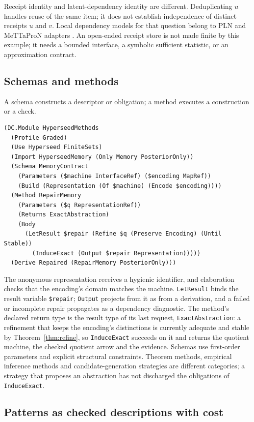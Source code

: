\documentclass[11pt]{article}
\newcommand{\code}[1]{\texttt{#1}}
\theoremstyle{definition}
\theoremstyle{plain}
\begin{document}
Receipt identity and latent-dependency identity are different. Deduplicating $u$ handles reuse of
the same item; it does not establish independence of distinct receipts $u$ and $v$. Local dependency
models for that question belong to PLN and MeTTaProN adapters \cite{plnoverlap,omegapln}. An
open-ended receipt store is not made finite by this example; it needs a bounded interface, a
symbolic sufficient statistic, or an approximation contract.

\subsection{Schemas and methods}

A schema constructs a descriptor or obligation; a method executes a construction or a check.
\begin{lstlisting}[basicstyle=\ttfamily\footnotesize,title={\scriptsize\ttfamily fixtures/hyperseed\_methods.metta}]
(DC.Module HyperseedMethods
  (Profile Graded)
  (Use Hyperseed FiniteSets)
  (Import HyperseedMemory (Only Memory PosteriorOnly))
  (Schema MemoryContract
    (Parameters ($machine InterfaceRef) ($encoding MapRef))
    (Build (Representation (Of $machine) (Encode $encoding))))
  (Method RepairMemory
    (Parameters ($q RepresentationRef))
    (Returns ExactAbstraction)
    (Body
      (LetResult $repair (Refine $q (Preserve Encoding) (Until Stable))
        (InduceExact (Output $repair Representation)))))
  (Derive Repaired (RepairMemory PosteriorOnly)))
\end{lstlisting}
The anonymous representation receives a hygienic identifier, and elaboration checks that the
encoding's domain matches the machine. \code{LetResult} binds the result variable \code{\$repair};
\code{Output} projects from it as from a derivation, and a failed or incomplete repair propagates as
a dependency diagnostic. The method's declared return type is the result type of its last request,
\code{ExactAbstraction}: a refinement that keeps the encoding's distinctions is currently adequate
and stable by Theorem~\ref{thm:refine}, so \code{InduceExact} succeeds on it and returns the
quotient machine, the checked quotient arrow and the evidence. Schemas use first-order parameters
and explicit structural constraints. Theorem methods, empirical inference methods and
candidate-generation strategies are different categories; a strategy that proposes an abstraction
has not discharged the obligations of \code{InduceExact}.

\subsection{Patterns as checked descriptions with cost}
\end{document}
